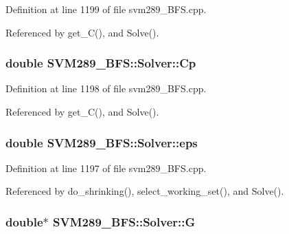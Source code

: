 Definition at line 1199 of file svm289\+\_\+\+B\+F\+S.\+cpp.



Referenced by get\+\_\+\+C(), and Solve().

\subsubsection[{\texorpdfstring{Cp}{Cp}}]{\setlength{\rightskip}{0pt plus 5cm}double S\+V\+M289\+\_\+\+B\+F\+S\+::\+Solver\+::\+Cp\hspace{0.3cm}{\ttfamily [protected]}}\hypertarget{class_s_v_m289___b_f_s_1_1_solver_a7bae981240155350227523f2bd08ee87}{}\label{class_s_v_m289___b_f_s_1_1_solver_a7bae981240155350227523f2bd08ee87}


Definition at line 1198 of file svm289\+\_\+\+B\+F\+S.\+cpp.



Referenced by get\+\_\+\+C(), and Solve().

\subsubsection[{\texorpdfstring{eps}{eps}}]{\setlength{\rightskip}{0pt plus 5cm}double S\+V\+M289\+\_\+\+B\+F\+S\+::\+Solver\+::eps\hspace{0.3cm}{\ttfamily [protected]}}\hypertarget{class_s_v_m289___b_f_s_1_1_solver_abb1bb8ca9d36e39da8cc535b4b49b57c}{}\label{class_s_v_m289___b_f_s_1_1_solver_abb1bb8ca9d36e39da8cc535b4b49b57c}


Definition at line 1197 of file svm289\+\_\+\+B\+F\+S.\+cpp.



Referenced by do\+\_\+shrinking(), select\+\_\+working\+\_\+set(), and Solve().

\subsubsection[{\texorpdfstring{G}{G}}]{\setlength{\rightskip}{0pt plus 5cm}double$\ast$ S\+V\+M289\+\_\+\+B\+F\+S\+::\+Solver\+::G\hspace{0.3cm}{\ttfamily [protected]}}\hypertarget{class_s_v_m289___b_f_s_1_1_solver_a23dd808efd06b7ef3a97c54b0c3c8824}{}\label{class_s_v_m289___b_f_s_1_1_solver_a23dd808efd06b7ef3a97c54b0c3c8824}


